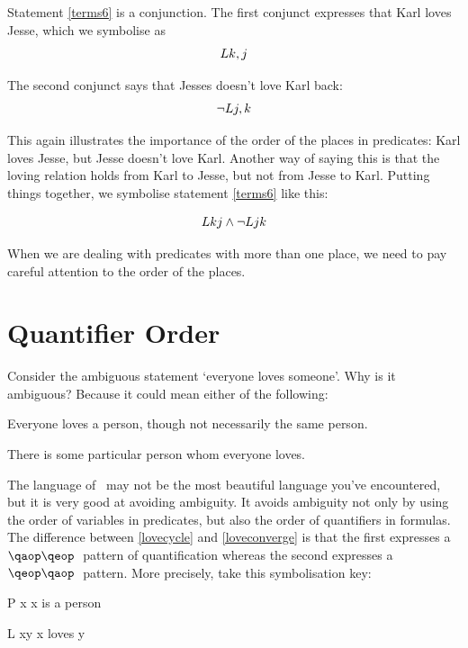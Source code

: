 \documentclass[PHIL101-Textbook.tex]{subfiles}
\begin{document}
\noindent Statement \ref{terms6} is a conjunction.
The first conjunct expresses that Karl loves Jesse, which we symbolise as
$$\mathord{L}{k,j}$$

\noindent The second conjunct says that Jesses doesn't love Karl back:
$$\neg \mathord{L}{j,k}$$ 

\noindent This again illustrates the importance of the order of the places in predicates: 
Karl loves Jesse, but Jesse doesn't love Karl.
Another way of saying this is that the loving relation holds from Karl to Jesse, but not from Jesse to Karl. 
Putting things together, we symbolise statement \ref{terms6} like this: 

$$\mathord{L}{k}j \land \neg \mathord{L}{j}k$$


When we are dealing with predicates with more than one place, we need to pay careful attention to the order of the places.


\section{Quantifier Order}

\begin{center}
  \href{https://youtu.be/Bny-1Fr4Tu0}
  {}
\end{center}

Consider the ambiguous statement `everyone loves someone'.
Why is it ambiguous? 
Because it could mean either of the following:
\begin{earg}
\item[\ex{lovecycle}] Everyone loves a person, though not necessarily the same person. 
\item[\ex{loveconverge}] There is some particular person whom everyone loves. 
\end{earg}

\noindent The language of \pl\ may not be the most beautiful language you've encountered, but it is very good at avoiding ambiguity.
It avoids ambiguity not only by using the order of variables in predicates, but also the order of quantifiers in formulas.
The difference between \ref{lovecycle} and \ref{loveconverge} is that the first expresses a $\qa \qe$ pattern of quantification whereas the second expresses a $\qe \qa$ pattern.
More precisely, take this symbolisation key:

\begin{ekey}
\item[\atom P x] x is a person
\item[\atom L xy ] x loves y
\end{ekey}
\end{document}
